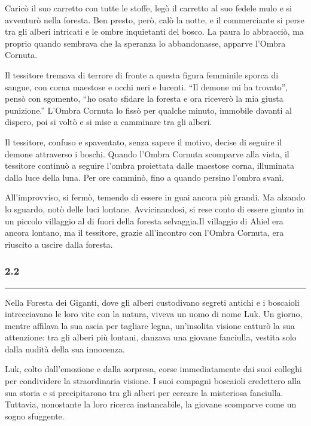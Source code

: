 Caricò il suo carretto con tutte le stoffe, legò il carretto al suo
fedele mulo e si avventurò nella foresta. Ben presto, però, calò la
notte, e il commerciante si perse tra gli alberi intricati e le ombre
inquietanti del bosco. La paura lo abbracciò, ma proprio quando sembrava
che la speranza lo abbandonasse, apparve l'Ombra Cornuta.

Il tessitore tremava di terrore di fronte a questa figura femminile
sporca di sangue, con corna maestose e occhi neri e lucenti. ``Il demone
mi ha trovato'', pensò con sgomento, ``ho osato sfidare la foresta e ora
riceverò la mia giusta punizione.'' L'Ombra Cornuta lo fissò per qualche
minuto, immobile davanti al dispero, poi si voltò e si mise a camminare
tra gli alberi.

Il tessitore, confuso e spaventato, senza sapere il motivo, decise di
seguire il demone attraverso i boschi. Quando l'Ombra Cornuta scomparve
alla vista, il tessitore continuò a seguire l'ombra proiettata dalle
maestose corna, illuminata dalla luce della luna. Per ore camminò, fino
a quando persino l'ombra svanì.

All'improvviso, si fermò, temendo di essere in guai ancora più grandi.
Ma alzando lo sguardo, notò delle luci lontane. Avvicinandosi, si rese
conto di essere giunto in un piccolo villaggio al di fuori della foresta
selvaggia.Il villaggio di Ahiel era ancora lontano, ma il tessitore,
grazie all'incontro con l'Ombra Cornuta, era riuscito a uscire dalla
foresta.

\subsubsection{2.2}\label{section}

\begin{center}\rule{0.5\linewidth}{0.5pt}\end{center}

Nella Foresta dei Giganti, dove gli alberi custodivano segreti antichi e
i boscaioli intrecciavano le loro vite con la natura, viveva un uomo di
nome Luk. Un giorno, mentre affilava la sua ascia per tagliare legna,
un'insolita visione catturò la sua attenzione: tra gli alberi più
lontani, danzava una giovane fanciulla, vestita solo dalla nudità della
sua innocenza.

Luk, colto dall'emozione e dalla sorpresa, corse immediatamente dai suoi
colleghi per condividere la straordinaria visione. I suoi compagni
boscaioli credettero alla sua storia e si precipitarono tra gli alberi
per cercare la misteriosa fanciulla. Tuttavia, nonostante la loro
ricerca instancabile, la giovane scomparve come un sogno sfuggente.

